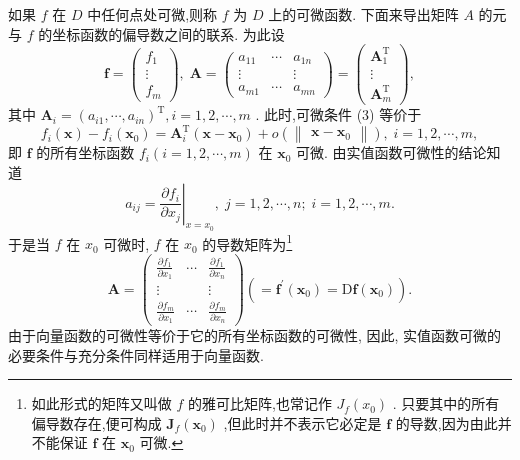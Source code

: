 如果 \(f\) 在 \(D\) 中任何点处可微,则称 \(f\) 为 \(D\) 上的可微函数. 下面来导出矩阵 \(A\) 的元与 \(f\) 的坐标函数的偏导数之间的联系. 为此设
\[
\mathbf{f} = \left( \begin{matrix} {f}_{1} \\  \vdots \\  {f}_{m} \end{matrix}\right) ,\;\mathbf{A} = \left( \begin{matrix} {a}_{11} & \cdots & {a}_{1n} \\  \vdots & & \vdots \\  {a}_{m1} & \cdots & {a}_{mn} \end{matrix}\right)  = \left( \begin{matrix} {\mathbf{A}}_{1}^{\mathrm{T}} \\  \vdots \\  {\mathbf{A}}_{m}^{\mathrm{T}} \end{matrix}\right) ,
\]
其中 \({\mathbf{A}}_{i} = {\left( {a}_{i1},\cdots ,{a}_{in}\right) }^{\mathrm{T}},i = 1,2,\cdots ,m\) . 此时,可微条件 (3) 等价于
\[
{f}_{i}\left( \mathbf{x}\right)  - {f}_{i}\left( {\mathbf{x}}_{0}\right)  = {\mathbf{A}}_{i}^{\mathrm{T}}\left( {\mathbf{x} - {\mathbf{x}}_{0}}\right)  + o\left( \begin{Vmatrix}{\mathbf{x} - {\mathbf{x}}_{0}}\end{Vmatrix}\right) ,\;i = 1,2,\cdots ,m, \tag{5}
\]
即 \(\mathbf{f}\) 的所有坐标函数 \({f}_{i}\left( {i = 1,2,\cdots ,m}\right)\) 在 \({\mathbf{x}}_{0}\) 可微. 由实值函数可微性的结论知道
\[
{a}_{ij} = {\left. \frac{\partial {f}_{i}}{\partial {x}_{j}}\right| }_{x = {x}_{0}},\;j = 1,2,\cdots ,n;\;i = 1,2,\cdots ,m. \tag{6}
\]
于是当 \(f\) 在 \({x}_{0}\) 可微时, \(f\) 在 \({x}_{0}\) 的导数矩阵为\footnote{如此形式的矩阵又叫做 \(f\) 的雅可比矩阵,也常记作 \({J}_{f}\left( {x}_{0}\right)\) . 只要其中的所有偏导数存在,便可构成 \({\mathbf{J}}_{f}\left( {\mathbf{x}}_{0}\right)\) ,但此时并不表示它必定是 \(\mathbf{f}\) 的导数,因为由此并不能保证 \(\mathbf{f}\) 在 \({\mathbf{x}}_{0}\) 可微.}
\[
\mathbf{A} = {\left( \begin{matrix} \frac{\partial {f}_{1}}{\partial {x}_{1}} & \cdots & \frac{\partial {f}_{1}}{\partial {x}_{n}} \\  \vdots & & \vdots \\  \frac{\partial {f}_{m}}{\partial {x}_{1}} & \cdots & \frac{\partial {f}_{m}}{\partial {x}_{n}} \end{matrix}\right) }\left( { = {\mathbf{f}}^{\prime }\left( {\mathbf{x}}_{0}\right)  = \mathrm{D}\mathbf{f}\left( {\mathbf{x}}_{0}\right) }\right) . \tag{7}
\]
由于向量函数的可微性等价于它的所有坐标函数的可微性, 因此, 实值函数可微的必要条件与充分条件同样适用于向量函数.

